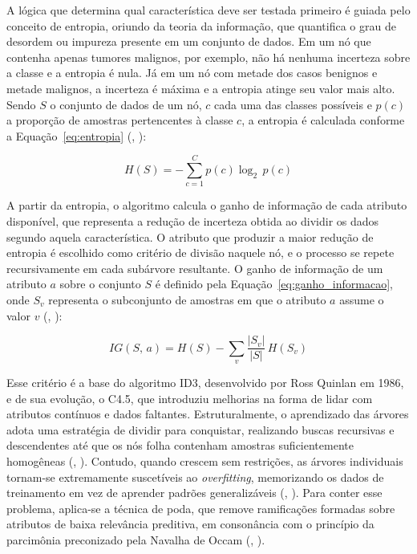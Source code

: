 \documentclass[
    12pt
    ,oneside
    ,a4paper
    ,chapter=TITLE
    ,section=TITLE
    ,sumario=abnt-6027-2012
    ,english,brazil]{abntex2} %
\begin{document}
A lógica que determina qual característica deve ser testada primeiro é guiada pelo conceito de entropia, oriundo da teoria da informação, que quantifica o grau de desordem ou impureza presente em um conjunto de dados. Em um nó que contenha apenas tumores malignos, por exemplo, não há nenhuma incerteza sobre a classe e a entropia é nula. Já em um nó com metade dos casos benignos e metade malignos, a incerteza é máxima e a entropia atinge seu valor mais alto. Sendo $S$ o conjunto de dados de um nó, $c$ cada uma das classes possíveis e $p(c)$ a proporção de amostras pertencentes à classe $c$, a entropia é calculada conforme a Equação~\ref{eq:entropia} (, \citeyear{ibm_decision_tree_2026}):

\begin{equation}
\label{eq:entropia}
H(S) = -\sum_{c=1}^{C} p(c) \log_2\, p(c)
\end{equation}

A partir da entropia, o algoritmo calcula o ganho de informação de cada atributo disponível, que representa a redução de incerteza obtida ao dividir os dados segundo aquela característica. O atributo que produzir a maior redução de entropia é escolhido como critério de divisão naquele nó, e o processo se repete recursivamente em cada subárvore resultante. O ganho de informação de um atributo $a$ sobre o conjunto $S$ é definido pela Equação~\ref{eq:ganho_informacao}, onde $S_v$ representa o subconjunto de amostras em que o atributo $a$ assume o valor $v$ (, \citeyear{ibm_decision_tree_2026}):

\begin{equation}
\label{eq:ganho_informacao}
IG(S,\, a) = H(S) - \sum_{v} \frac{|S_v|}{|S|}\, H(S_v)
\end{equation}

Esse critério é a base do algoritmo ID3, desenvolvido por Ross Quinlan em 1986, e de sua evolução, o C4.5, que introduziu melhorias na forma de lidar com atributos contínuos e dados faltantes. Estruturalmente, o aprendizado das árvores adota uma estratégia de dividir para conquistar, realizando buscas recursivas e descendentes até que os nós folha contenham amostras suficientemente homogêneas (, \citeyear{ibm_decision_tree_2026}). Contudo, quando crescem sem restrições, as árvores individuais tornam-se extremamente suscetíveis ao \textit{overfitting}, memorizando os dados de treinamento em vez de aprender padrões generalizáveis (, \citeyear{Faceli2011}). Para conter esse problema, aplica-se a técnica de poda, que remove ramificações formadas sobre atributos de baixa relevância preditiva, em consonância com o princípio da parcimônia preconizado pela Navalha de Occam (, \citeyear{ibm_decision_tree_2026}).
\end{document}
